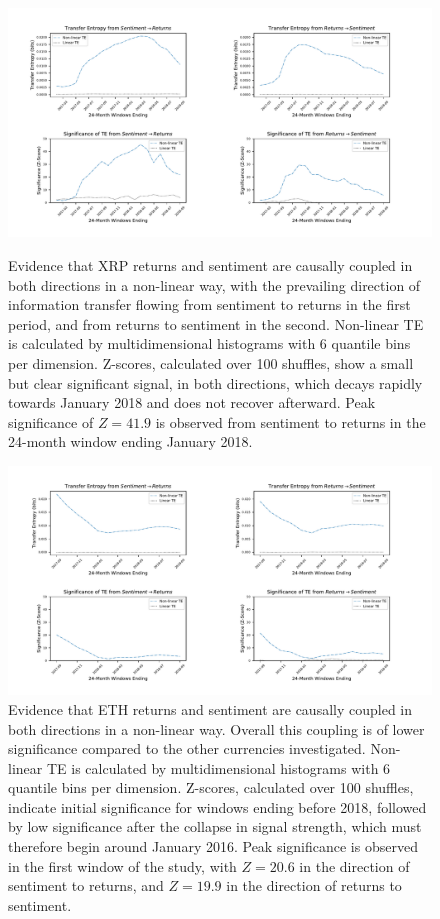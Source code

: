 \documentclass[]{rsos}%
\begin{document}
  \begin{figure}[!htbp]
    \includegraphics[width=\linewidth]{images/XRP.pdf}
    \caption{Evidence that XRP returns and sentiment are causally coupled in both directions in a non-linear way, with the prevailing direction of information transfer flowing from sentiment to returns in the first period, and from returns to sentiment in the second. Non-linear TE is calculated by multidimensional histograms with 6 quantile bins per dimension. Z-scores, calculated over 100 shuffles, show a small but clear significant signal, in both directions, which decays rapidly towards January 2018 and does not recover afterward. Peak significance of $Z=41.9$ is observed from sentiment to returns in the 24-month window ending January 2018.}
    \label{fig:XRP_TE}

    \includegraphics[width=\linewidth]{images/ETH.pdf} 
    \caption{Evidence that ETH returns and sentiment are causally coupled in both directions in a non-linear way. Overall this coupling is of lower significance compared to the other currencies investigated. Non-linear TE is calculated by multidimensional histograms with 6 quantile bins per dimension. Z-scores, calculated over 100 shuffles, indicate initial significance for windows ending before 2018, followed by low significance after the collapse in signal strength, which must therefore begin around January 2016. Peak significance is observed in the first window of the study, with $Z=20.6$ in the direction of sentiment to returns, and $Z=19.9$ in the direction of returns to sentiment.     
  }
  \label{fig:ETH_TE}
  \vspace{-34pt}
  \end{figure}
  
\end{document}
